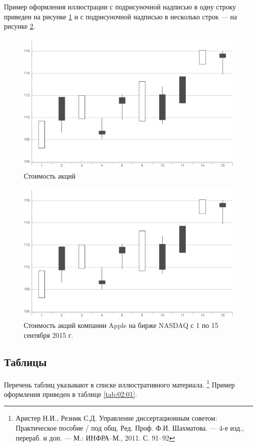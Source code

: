 \documentclass[12pt,a4paper, oneside]{extreport}
\begin{document}
Пример оформления иллюстрации с подрисуночной надписью в одну строку приведен на рисунке \ref{ris:02:01}  и с подрисуночной надписью в несколько строк --- на рисунке \ref{ris:02:02}.

\begin{figure}[H]
  \centering
    \includegraphics [width=0.5\linewidth]{Ris-01}
  \caption{Стоимость акций }\label{ris:02:01}
\end{figure}

\begin{figure}[H]
  \centering
    \includegraphics [width=0.5\linewidth]{Ris-01}
  \caption{Стоимость акций компании Apple на бирже NASDAQ с 1 по 15 сентября 2015 г.}\label{ris:02:02}
\end{figure}


\subsection{Таблицы}

 
Перечень таблиц указывают в списке иллюстративного материала. \footnote{Аристер Н.И., Резник С.Д. Управление диссертационным советом: Практическое пособие / под общ. Ред. Проф. Ф.И. Шахматова. --- 4-е изд., перераб. и доп. --- М.: ИНФРА–М., 2011. С. 91–92} Пример оформления приведен в таблице \ref{tab:02:01}.
\end{document}

